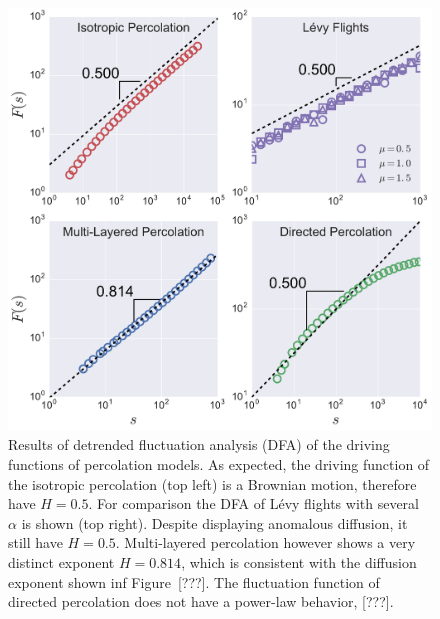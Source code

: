 \begin{figure}
\begin{center}
    \includegraphics[scale=0.45]{chapters/ch6-asle/figs/dfaresults}
\end{center}
\caption{Results of detrended fluctuation analysis (DFA) of the driving
    functions of percolation models. As expected, the driving function of the
    isotropic percolation (top left) is a Brownian motion, therefore have
    $H=0.5$. For comparison the DFA of L\'evy flights with several $\alpha$ is
    shown (top right). Despite displaying anomalous diffusion, it still have
    $H=0.5$. Multi-layered percolation however shows a very distinct exponent
    $H=0.814$, which is consistent with the diffusion exponent shown inf
    Figure~[???]. The fluctuation function of directed percolation does not
    have a power-law behavior, [???].}
\label{fig:dfaresults}
\end{figure}

